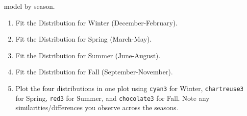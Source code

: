 \documentclass{article}\usepackage[]{graphicx}\usepackage[]{xcolor}
\begin{document}
\begin{enumerate}
  model by season.
  \begin{enumerate}
    \item Fit the Distribution for Winter (December-February).
    \item Fit the Distribution for Spring (March-May).
    \item Fit the Distribution for Summer (June-August).
    \item Fit the Distribution for Fall (September-November).
    \item Plot the four distributions in one plot using \texttt{cyan3} for Winter,
    \texttt{chartreuse3} for Spring, \texttt{red3} for Summer, and \texttt{chocolate3}
    for Fall. Note any similarities/differences you observe across the seasons.
  \end{enumerate}
\end{enumerate}


\end{document}
